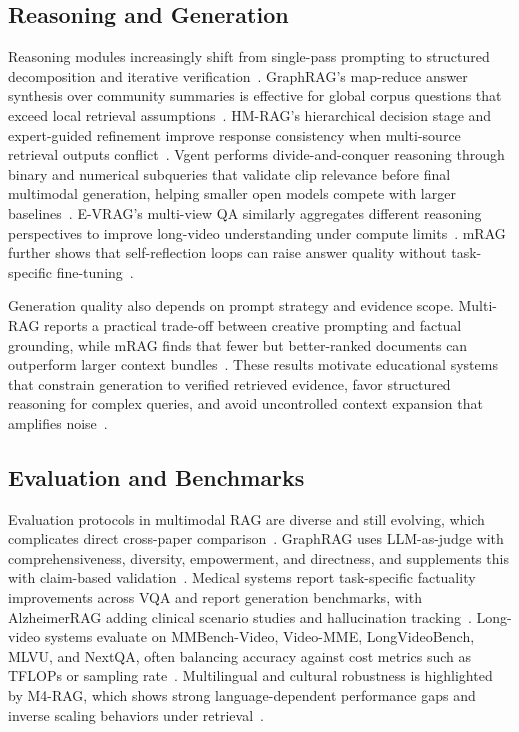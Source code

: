 \documentclass[conference]{IEEEtran}
\begin{document}
    \subsection{Reasoning and Generation}

    Reasoning modules increasingly shift from single-pass prompting to structured decomposition and iterative verification~\cite{singh2024agentic,hu2024mrag,shen2024vgent}. GraphRAG's map-reduce answer synthesis over community summaries is effective for global corpus questions that exceed local retrieval assumptions~\cite{edge2024local}. HM-RAG's hierarchical decision stage and expert-guided refinement improve response consistency when multi-source retrieval outputs conflict~\cite{liu2024hmrag}. Vgent performs divide-and-conquer reasoning through binary and numerical subqueries that validate clip relevance before final multimodal generation, helping smaller open models compete with larger baselines~\cite{shen2024vgent}. E-VRAG's multi-view QA similarly aggregates different reasoning perspectives to improve long-video understanding under compute limits~\cite{xu2024evrag}. mRAG further shows that self-reflection loops can raise answer quality without task-specific fine-tuning~\cite{hu2024mrag}.

    Generation quality also depends on prompt strategy and evidence scope. Multi-RAG reports a practical trade-off between creative prompting and factual grounding, while mRAG finds that fewer but better-ranked documents can outperform larger context bundles~\cite{mao2024multi,hu2024mrag}. These results motivate educational systems that constrain generation to verified retrieved evidence, favor structured reasoning for complex queries, and avoid uncontrolled context expansion that amplifies noise~\cite{hu2024mrag,mao2024multi,shen2024vgent}.

    \subsection{Evaluation and Benchmarks}

    Evaluation protocols in multimodal RAG are diverse and still evolving, which complicates direct cross-paper comparison~\cite{brown2024systematic,mei2024survey}. GraphRAG uses LLM-as-judge with comprehensiveness, diversity, empowerment, and directness, and supplements this with claim-based validation~\cite{edge2024local}. Medical systems report task-specific factuality improvements across VQA and report generation benchmarks, with AlzheimerRAG adding clinical scenario studies and hallucination tracking~\cite{xia2024mmed,lahiri2024alzheimer}. Long-video systems evaluate on MMBench-Video, Video-MME, LongVideoBench, MLVU, and NextQA, often balancing accuracy against cost metrics such as TFLOPs or sampling rate~\cite{mao2024multi,xu2024evrag,shen2024vgent}. Multilingual and cultural robustness is highlighted by M4-RAG, which shows strong language-dependent performance gaps and inverse scaling behaviors under retrieval~\cite{anugraha2024m4}.
\end{document}
